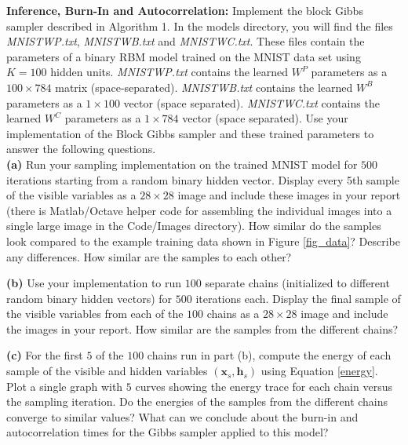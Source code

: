 \documentclass[11pt]{article}
\newcommand{\mbf}[1]{{\mathbf{#1}}}
\begin{document}
\begin{problem}{20} \textbf{Inference, Burn-In and Autocorrelation:} Implement the block Gibbs sampler described in Algorithm 1. In the models directory, you will find the files \textit{MNISTWP.txt}, \textit{MNISTWB.txt} and \textit{MNISTWC.txt}. These files contain the parameters of a binary RBM model trained on the MNIST data set using $K=100$ hidden units. \textit{MNISTWP.txt} contains the learned $W^P$ parameters as a $100\times 784$ matrix (space-separated). \textit{MNISTWB.txt} contains the learned $W^B$ parameters as a $1\times 100$ vector (space separated). \textit{MNISTWC.txt} contains the learned $W^C$ parameters as a $1\times 784$ vector (space separated). Use your implementation of the Block Gibbs sampler and these trained parameters to answer the following questions.\\

\textbf{(a)} Run your sampling implementation on the trained MNIST model for $500$ iterations starting from a random binary hidden vector. Display every 5th sample of the visible variables as a $28 \times 28$ image and include these images in your report (there is Matlab/Octave helper code for assembling the
individual images into a single large image in the Code/Images directory). How similar do the samples look compared to the example training data shown in Figure \ref{fig_data}? Describe any differences. How similar are the samples to each other? 

\textbf{(b)} Use your implementation to run $100$ separate chains (initialized to different random binary hidden vectors) for $500$ iterations each. Display the final sample of the visible variables from each of the $100$ chains as a $28 \times 28$ image and include the images in your report. How similar are the samples from the different chains? 

\textbf{(c)} For the first $5$ of the $100$ chains run in part (b), compute the energy of each sample of the visible and hidden variables $(\mbf{x}_{s},\mbf{h}_{s})$ using Equation \ref{energy}. Plot a single graph with $5$ curves showing the energy trace for each chain versus the sampling iteration. Do the energies of the samples from the different chains converge to similar values? What can we conclude about the burn-in and autocorrelation times for the Gibbs sampler applied to this model?
\end{problem}
\end{document}
